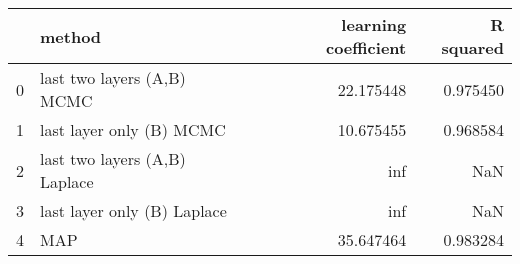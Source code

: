 \begin{tabular}{llrr}
\toprule
{} &                         method &  learning coefficient &  R squared \\
\midrule
0 &     last two layers (A,B) MCMC &             22.175448 &   0.975450 \\
1 &       last layer only (B) MCMC &             10.675455 &   0.968584 \\
2 &  last two layers (A,B) Laplace &                   inf &        NaN \\
3 &    last layer only (B) Laplace &                   inf &        NaN \\
4 &                            MAP &             35.647464 &   0.983284 \\
\bottomrule
\end{tabular}
